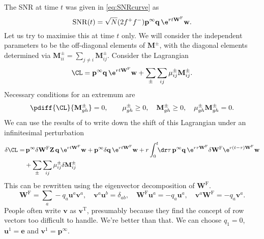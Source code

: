\documentclass[12pt]{article}
\newcommand{\trans}{^\mathrm{T}}
\newcommand{\onev}{\mathbf{e}}
\newcommand{\eq}{\mathbf{p}^\infty}
\newcommand{\fund}{\mathbf{Z}}
\newcommand{\w}{\mathbf{w}}
\newcommand{\uv}{\mathbf{u}}
\newcommand{\vv}{\mathbf{v}}
\newcommand{\W}{\mathbf{W}}
\newcommand{\M}{\mathbf{M}}
\newcommand{\enc}{\mathbf{q}}
\newcommand{\frg}{\W^{\mathrm{F}}}
\DeclareMathOperator{\SNR}{SNR}
\begin{document}
The SNR at time $t$ was given in \eqref{eq:SNRcurve} as
%
\begin{equation*}
  \SNR(t) = \sqrt{N} (2f^+f^-) \eq \enc \, \e^{rt\frg}\w.
\end{equation*}
%
Let us try to maximise this at time $t$ only.
We will consider the independent parameters to be the off-diagonal elements of $\M^\pm$, with the diagonal elements determined via $\M^\pm_{ii} = \sum_{j\neq i} \M^\pm_{ij}$.
Consider the Lagrangian
%
\begin{equation}\label{eq:finlagrangian}
  \CL = \eq \enc\, \e^{rt\frg}\w + \sum_\pm \sum_{ij} \mu^\pm_{ij} \M^\pm_{ij}.
\end{equation}
%
Necessary conditions for an extremum are
%
\begin{equation*}
  \pdiff{\CL}{\M^\pm_{gh}} = 0,
  \qquad
    \mu^\pm_{gh} \geq 0,\quad
    \M^\pm_{gh} \geq 0,\quad
    \mu^\pm_{gh}\M^\pm_{gh} = 0.
\end{equation*}
%
We can use the results of \cite{Ortiz2001diffmatexp} to write down the shift of this Lagrangian under an infinitesimal perturbation
%
\begin{equation}\label{eq:finpert}
\begin{aligned}
  \delta\CL =&\, \eq \delta\frg \fund\, \enc \, \e^{rt\frg} \w
    + \eq \delta\enc \, \e^{rt\frg} \w %
   + r\int_{0}^{t}\!\!\dr\tau\, \eq \enc\, \e^{r\tau\frg} \delta\frg \e^{r(t-\tau)\frg} \w\\
   &+ \sum_\pm \sum_{ij} \mu^\pm_{ij} \delta\M^\pm_{ij}
\end{aligned}
\end{equation}
%
This can be rewritten using the eigenvector decomposition of $\frg$.
%
\begin{equation}\label{eq:eigendecomp}
  \frg = \sum_a -q_a \uv^a \vv^a,
  \quad
  \vv^a \uv^b = \delta_{ab},
  \quad
  \frg \uv^a = -q_a \uv^a,
  \quad
  \vv^a \frg = -q_a \vv^a.
\end{equation}
%
People often write $\vv$ as $\vv\trans$, presumably because they find the concept of row vectors too difficult to handle.
We're better than that.
We can choose $q_1=0$, $\uv^1=\onev$ and $\vv^1=\eq$.
\end{document}
